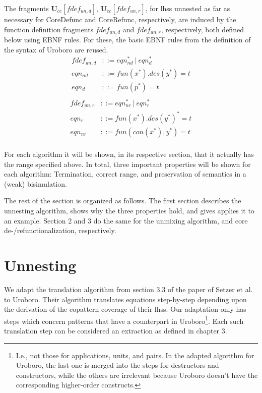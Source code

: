 \begin{definition}
The fragments $\mathbf{U}_{cc}[fdef_{un,d}]$, $\mathbf{U}_{cc}[fdef_{un,r}]$, for lhss unnested as far as necessary for \textsf{CoreDefunc} and \textsf{CoreRefunc}, respectively, are induced by the function definition fragments $fdef_{un,d}$ and $fdef_{un,r}$, respectively, both defined below using EBNF rules. For these, the basic EBNF rules from the definition of the syntax of Uroboro are reused.
\begin{align*}
fdef_{un,d} &::= eqn_{nd}^* ~ | ~ eqn_d^* \\
eqn_{nd} &::= fun(x^*).des(y^*) = t \\
eqn_d &::= fun(p^*) = t \\
\end{align*}
\begin{align*}
fdef_{un,r} &::= eqn_{nr}^* ~ | ~ eqn_r^* \\
eqn_r &::= fun(x^*).des(y^*)^* = t \\
eqn_{nr} &::= fun(con(x^*), y^*) = t \\
\end{align*}
\end{definition}

For each algorithm it will be shown, in its respective section, that it actually has the range specified above. In total, three important properties will be shown for each algorithm: Termination, correct range, and preservation of semantics in a (weak) bisimulation.

The rest of the section is organized as follows. The first section describes the unnesting algorithm, shows why the three properties hold, and gives applies it to an example. Section 2 and 3 do the same for the unmixing algorithm, and core de-/refunctionalization, respectively.

\section{Unnesting}

We adapt the translation algorithm from section 3.3 of the paper of Setzer et al. to Uroboro. Their algorithm translates equations step-by-step depending upon the derivation of the copattern coverage of their lhss. Our adaptation only has steps which concern patterns that have a counterpart in Uroboro\footnote{I.e., not those for applications, units, and pairs. In the adapted algorithm for Uroboro, the last one is merged into the steps for destructors and constructors, while the others are irrelevant because Uroboro doesn't have the corresponding higher-order constructs.}. Each such translation step can be considered an extraction as defined in chapter 3.

